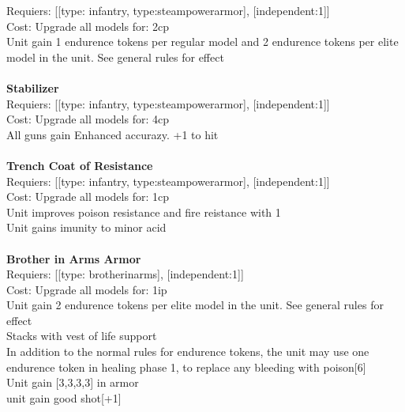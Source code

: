 Requiers: [[type: infantry, type:steampowerarmor], [independent:1]] \\
Cost: Upgrade all models for: 2cp \\
Unit gain 1 endurence tokens per regular model  and 2 endurence tokens per elite model in the unit. See general rules for effect\\ 









\ \\
{\bf Stabilizer } \\

Requiers: [[type: infantry, type:steampowerarmor], [independent:1]] \\
Cost: Upgrade all models for: 4cp \\
All guns gain Enhanced accurazy. +1 to hit\\ 









\ \\
{\bf Trench Coat of Resistance } \\

Requiers: [[type: infantry, type:steampowerarmor], [independent:1]] \\
Cost: Upgrade all models for: 1cp \\
Unit improves poison resistance and fire reistance with 1\\ 
Unit gains imunity to minor acid\\ 









\ \\
{\bf Brother in Arms Armor } \\

Requiers: [[type: brotherinarms], [independent:1]] \\
Cost: Upgrade all models for: 1ip \\
Unit gain 2 endurence tokens per elite model in the unit. See general rules for effect\\ 
Stacks with vest of life support\\ 
In addition to the normal rules for endurence tokens, the unit may use one endurence token in healing phase 1, to replace any bleeding with poison[6]\\ 
Unit gain [3,3,3,3] in armor\\ 
unit gain good shot[+1]\\ 









